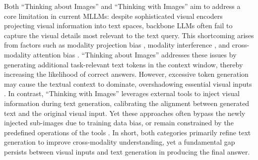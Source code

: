 Both ``Thinking about Images'' and ``Thinking with Images'' aim to address a core limitation in current MLLMs: despite sophisticated visual encoders projecting visual information into text spaces, backbone LLMs often fail to capture the visual details most relevant to the text query. This shortcoming arises from factors such as modality projection bias \citep{VLMClassifier,liu2023llava}, modality interference \citep{cai2025diagnosingmitigatingmodalityinterference,wang2025text,pezeshkpour2025mixedsignalsdecodingvlms,deng2025wordsvisionvisionlanguagemodels}, and cross-modality attention bias \citep{zhang2025vispruner}. ``Thinking about Images'' addresses these issues by generating additional task-relevant text tokens in the context window, thereby increasing the likelihood of correct answers. However, excessive token generation may cause the textual context to dominate, overshadowing essential visual inputs \citep{huang2024opera}. In contrast, ``Thinking with Images'' leverages external tools to inject visual information during text generation, calibrating the alignment between generated text and the original visual input. Yet these approaches often bypass the newly injected sub-images due to training data bias, or remain constrained by the predefined operations of the tools \citep{pixelreasoner}. In short, both categories primarily refine text generation to improve cross-modality understanding, yet a fundamental gap persists between visual inputs and text generation in producing the final answer.

